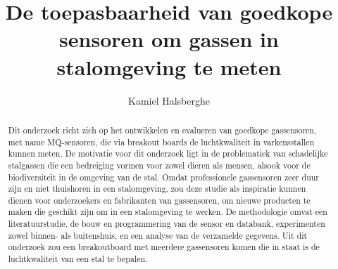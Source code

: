 \documentclass{hogent-article}
\title{De toepasbaarheid van goedkope sensoren om gassen in stalomgeving te meten}
\author{Kamiel Halsberghe}
\begin{document}
\begin{abstract}
  
  
  
  
  Dit onderzoek richt zich op het ontwikkelen en evalueren van goedkope gassensoren, met name MQ-sensoren, die via breakout boards de luchtkwaliteit in varkensstallen kunnen meten. De motivatie voor dit onderzoek ligt in de problematiek van schadelijke stalgassen die een bedreiging vormen voor zowel dieren als mensen, alsook voor de biodiversiteit in de omgeving van de stal. Omdat professionele gassensoren zeer duur zijn en niet thuishoren in een stalomgeving, zou deze studie als inspiratie kunnen dienen voor onderzoekers en fabrikanten van gassensoren, om nieuwe producten te maken die geschikt zijn om in een stalomgeving te werken. De methodologie omvat een literatuurstudie, de bouw en programmering van de sensor en databank, experimenten zowel binnen- als buitenshuis, en een analyse van de verzamelde gegevens. Uit dit onderzoek zou een breakoutboard met meerdere gassensoren komen die in staat is de luchtkwaliteit van een stal te bepalen.
  

\end{abstract}

\tableofcontents



\printbibliography[heading=bibintoc]
\end{document}
